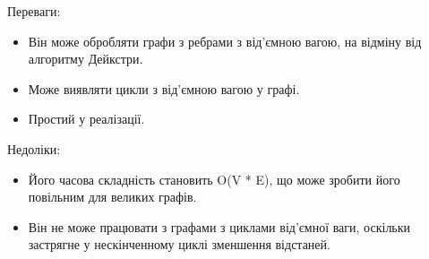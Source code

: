Переваги:
\begin{itemize}
    \item Він може обробляти графи з ребрами з від'ємною вагою, на відміну від алгоритму Дейкстри.
    \item Може виявляти цикли з від'ємною вагою у графі.
    \item Простий у реалізації.
\end{itemize}

Недоліки:
\begin{itemize}
    \item Його часова складність становить O(V * E), що може зробити його повільним для великих графів.
    \item Він не може працювати з графами з циклами від'ємної ваги, оскільки застрягне у нескінченному циклі зменшення відстаней.
\end{itemize}
